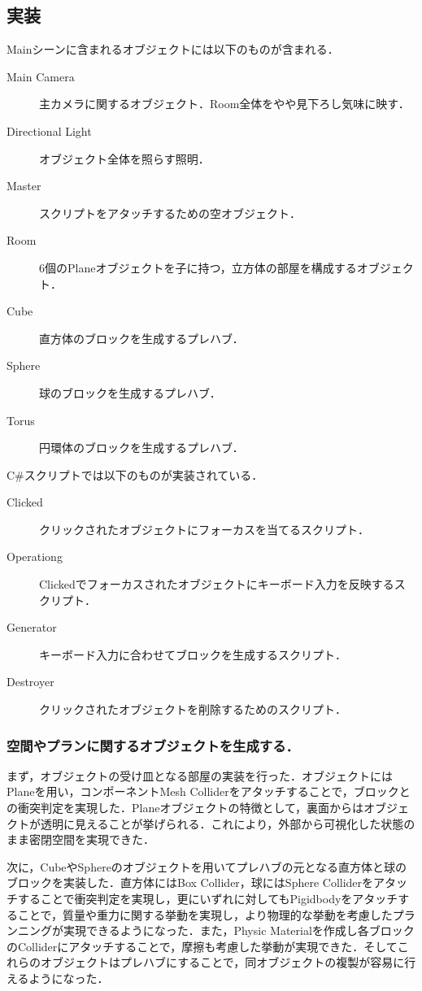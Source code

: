 \documentclass[uplatex,12pt]{jsarticle}
\begin{document}
\subsection{実装}
Mainシーンに含まれるオブジェクトには以下のものが含まれる．
\begin{description}
\item[Main Camera] 主カメラに関するオブジェクト．Room全体をやや見下ろし気味に映す．
\item[Directional Light] オブジェクト全体を照らす照明．
\item[Master] スクリプトをアタッチするための空オブジェクト．
\item[Room] 6個のPlaneオブジェクトを子に持つ，立方体の部屋を構成するオブジェクト．
\item[Cube] 直方体のブロックを生成するプレハブ．
\item[Sphere] 球のブロックを生成するプレハブ．
\item[Torus] 円環体のブロックを生成するプレハブ．
\end{description} 

C\#スクリプトでは以下のものが実装されている．
\begin{description}
\item[Clicked] クリックされたオブジェクトにフォーカスを当てるスクリプト．
\item[Operationg] Clickedでフォーカスされたオブジェクトにキーボード入力を反映するスクリプト．
\item[Generator] キーボード入力に合わせてブロックを生成するスクリプト．
\item[Destroyer] クリックされたオブジェクトを削除するためのスクリプト．
\end{description}

\subsubsection{空間やプランに関するオブジェクトを生成する．}
まず，オブジェクトの受け皿となる部屋の実装を行った．オブジェクトにはPlaneを用い，コンポーネントMesh Colliderをアタッチすることで，ブロックとの衝突判定を実現した．Planeオブジェクトの特徴として，裏面からはオブジェクトが透明に見えることが挙げられる．これにより，外部から可視化した状態のまま密閉空間を実現できた．

次に，CubeやSphereのオブジェクトを用いてプレハブの元となる直方体と球のブロックを実装した．直方体にはBox Collider，球にはSphere Colliderをアタッチすることで衝突判定を実現し，更にいずれに対してもPigidbodyをアタッチすることで，質量や重力に関する挙動を実現し，より物理的な挙動を考慮したプランニングが実現できるようになった．また，Physic Materialを作成し各ブロックのColliderにアタッチすることで，摩擦も考慮した挙動が実現できた．そしてこれらのオブジェクトはプレハブにすることで，同オブジェクトの複製が容易に行えるようになった．
\end{document}
